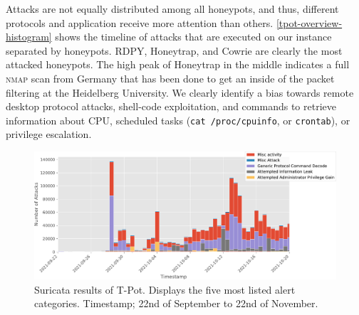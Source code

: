 Attacks are not equally distributed among all honeypots, and thus, different protocols and application receive more attention than others.
\autoref{tpot-overview-histogram} shows the timeline of attacks that are executed on our instance separated by honeypots.
RDPY, Honeytrap, and Cowrie are clearly the most attacked honeypots.
The high peak of Honeytrap in the middle indicates a full \textsc{nmap} scan from Germany that has been done to get an inside of the packet filtering at the Heidelberg University.
We clearly identify a bias towards remote desktop protocol attacks, shell-code exploitation, and commands to retrieve information about CPU, scheduled tasks (\verb|cat /proc/cpuinfo|, or \verb|crontab|), or privilege escalation.

\begin{figure}[ht]
    \centering
    \includegraphics[width=\textwidth]{figures/tpot-suricata-alerts.pdf}
    \caption[Suricata results of T-Pot]{Suricata results of T-Pot. Displays the five most listed alert categories. Timestamp; 22nd of September to 22nd of November.}
    \label{fig:suricata-results}
\end{figure}


